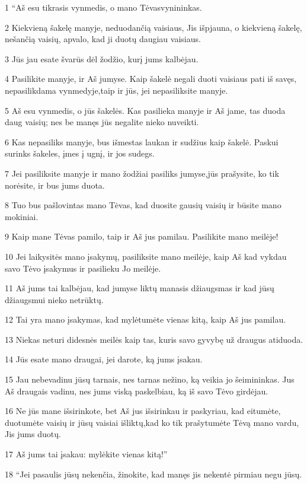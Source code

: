 \par 1 “Aš esu tikrasis vynmedis, o mano Tėvas­vynininkas. 
\par 2 Kiekvieną šakelę manyje, neduodančią vaisiaus, Jis išpjauna, o kiekvieną šakelę, nešančią vaisių, apvalo, kad ji duotų daugiau vaisiaus. 
\par 3 Jūs jau esate švarūs dėl žodžio, kurį jums kalbėjau. 
\par 4 Pasilikite manyje, ir Aš jumyse. Kaip šakelė negali duoti vaisiaus pati iš savęs, nepasilikdama vynmedyje,­taip ir jūs, jei nepasiliksite manyje. 
\par 5 Aš esu vynmedis, o jūs šakelės. Kas pasilieka manyje ir Aš jame, tas duoda daug vaisių; nes be manęs jūs negalite nieko nuveikti. 
\par 6 Kas nepasiliks manyje, bus išmestas laukan ir sudžius kaip šakelė. Paskui surinks šakeles, įmes į ugnį, ir jos sudegs. 
\par 7 Jei pasiliksite manyje ir mano žodžiai pasiliks jumyse,­jūs prašysite, ko tik norėsite, ir bus jums duota. 
\par 8 Tuo bus pašlovintas mano Tėvas, kad duosite gausių vaisių ir būsite mano mokiniai. 
\par 9 Kaip mane Tėvas pamilo, taip ir Aš jus pamilau. Pasilikite mano meilėje! 
\par 10 Jei laikysitės mano įsakymų, pasiliksite mano meilėje, kaip Aš kad vykdau savo Tėvo įsakymus ir pasilieku Jo meilėje. 
\par 11 Aš jums tai kalbėjau, kad jumyse liktų manasis džiaugsmas ir kad jūsų džiaugsmui nieko netrūktų. 
\par 12 Tai yra mano įsakymas, kad mylėtumėte vienas kitą, kaip Aš jus pamilau. 
\par 13 Niekas neturi didesnės meilės kaip tas, kuris savo gyvybę už draugus atiduoda. 
\par 14 Jūs esate mano draugai, jei darote, ką jums įsakau. 
\par 15 Jau nebevadinu jūsų tarnais, nes tarnas nežino, ką veikia jo šeimininkas. Jus Aš draugais vadinu, nes jums viską paskelbiau, ką iš savo Tėvo girdėjau. 
\par 16 Ne jūs mane išsirinkote, bet Aš jus išsirinkau ir paskyriau, kad eitumėte, duotumėte vaisių ir jūsų vaisiai išliktų,­kad ko tik prašytumėte Tėvą mano vardu, Jis jums duotų. 
\par 17 Aš jums tai įsakau: mylėkite vienas kitą!” 
\par 18 “Jei pasaulis jūsų nekenčia, žinokite, kad manęs jis nekentė pirmiau negu jūsų. 
